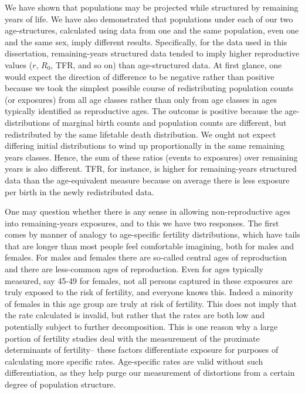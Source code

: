 
We have shown that populations may be projected while structured by
remaining years of life. We have also demonstrated that populations under each
of our two age-structures, calculated using data from one and the same
population, even one and the same sex, imply different results. Specifically, for the data used in this
dissertation, remaining-years structured data tended to imply higher
reproductive values ($r$, $R_0$, TFR, and so on) than age-structured data. At
first glance, one would expect the direction of difference to be negative 
rather than positive because we took the simplest possible course of
redistributing population counts (or exposures) from all age classes rather than
only from age classes in ages typically identified as reproductive ages. The
outcome is positive because the age-distributions of marginal birth counts and
population counts are different, but redistributed by the same lifetable death
distribution. We ought not expect differing initial distributions to wind up
proportionally in the same remaining years classes. Hence, the sum of these
ratios (events to exposures) over remaining years is also different. TFR, for
instance, is higher for remaining-years structured data than the age-equivalent
measure because on average there is less exposure per birth in the newly
redistributed data.

One may question whether there is any sense in allowing non-reproductive ages
into remaining-years exposures, and to this we have two responses. The first
comes by manner of analogy to age-specific fertility distributions, which
have tails that are longer than most people feel comfortable imagining, 
both for males and females. For males and
females there are so-called central ages of reproduction and there are
less-common ages of reproduction. Even for ages typically measured, say
45-49 for females, not all persons captured in these exposures are truly
exposed to the risk of fertility, and everyone knows this. Indeed a minority
of females in this age group are truly at risk of fertility. This does not imply
that the rate calculated is invalid, but rather that the rates are both low and
potentially subject to further decomposition. This is one reason why a large
portion of fertility studies deal with the measurement of the proximate determinants of fertility-- these
factors differentiate exposure for purposes of calculating more specific rates.
Age-specific rates are valid without such differentiation, as they help purge
our measurement of distortions from a certain degree of population structure. 

